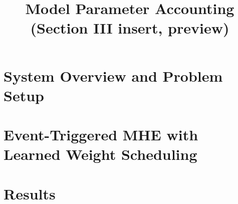 \documentclass[conference]{IEEEtran}
\begin{document}
\title{Model Parameter Accounting (Section III insert, preview)}
\author{}
\maketitle

\section{System Overview and Problem Setup}\label{sec:setup}
\section{Event-Triggered MHE with Learned Weight Scheduling}\label{sec:method}
\section{Results}\label{sec:results}
\setcounter{section}{2}


\providecommand{\dJ}{\Delta J}
\providecommand{\cvec}{\mathbf{c}}
\providecommand{\rp}{\mathbf{r}_p}
\providecommand{\mpay}{\hat{m}_p}          %
\providecommand{\mb}{m_b}                %
\providecommand{\mt}{m_t}                %
\providecommand{\Tphys}{T_{\mathrm{phys}}}
\providecommand{\tauphys}{\boldsymbol{\tau}_{\mathrm{phys}}}
\providecommand{\tcom}{\boldsymbol{\tau}_{\mathrm{com}}}
\end{document}
